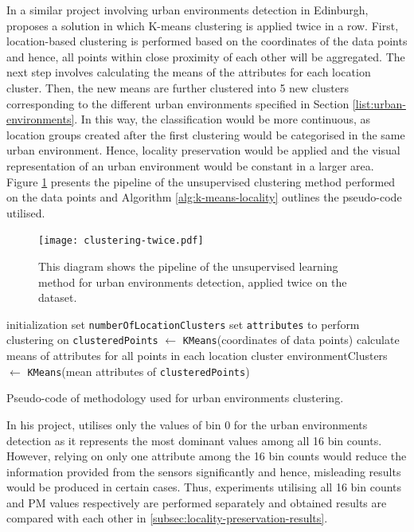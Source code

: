 \documentclass[bsc,frontabs,twoside,singlespacing, parskip,deptreport]{infthesis}     %
\begin{document}
In a similar project involving urban environments detection in Edinburgh, \cite{Kotsev2015} proposes a solution in which K-means clustering is applied twice in a row. First, location-based clustering is performed based on the coordinates of the data points and hence, all points within close proximity of each other will be aggregated. The next step involves calculating the means of the attributes for each location cluster. Then, the new means are further clustered into 5 new clusters corresponding to the different urban environments specified in Section \ref{list:urban-environments}. In this way, the classification would be more continuous, as location groups created after the first clustering would be categorised in the same urban environment. Hence, locality preservation would be applied and  the visual representation of an urban environment would be constant in a larger area. Figure \ref{fig:clustering-twice} presents the pipeline of the unsupervised clustering method performed on the data points and Algorithm \ref{alg:k-means-locality} outlines the pseudo-code utilised.

\begin{figure}[h!]
  \center
  \texttt{[image: clustering-twice.pdf]}
  \caption{This diagram shows the pipeline of the unsupervised learning method for urban environments detection, applied twice on the dataset.}
  \label{fig:clustering-twice}
\end{figure}

\begin{algorithm}[h!]
 initialization\;
 set \texttt{numberOfLocationClusters}\;
 set \texttt{attributes} to perform clustering on\;
 \texttt{clusteredPoints} $ \leftarrow $ \texttt{KMeans}(coordinates of data points)\;
 calculate means of attributes for all points in each location cluster\;
 environmentClusters $\leftarrow$ \texttt{KMeans}(mean attributes of \texttt{clusteredPoints})\;
 \caption{Pseudo-code of methodology used for urban environments clustering.}
 \label{alg:k-means-locality}
\end{algorithm}

In his project, \cite{Kotsev2015} utilises only the values of bin 0 for the urban environments detection as it represents the most dominant values among all 16 bin counts. However, relying on only one attribute among the 16 bin counts would reduce the information provided from the sensors significantly and hence, misleading results would be produced in certain cases. Thus, experiments utilising all 16 bin counts and PM values respectively are performed separately and obtained results are compared with each other in \ref{subsec:locality-preservation-results}.
\end{document}
